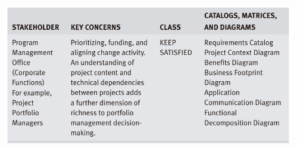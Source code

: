 \documentclass[aspectratio=169, table]{beamer}
\begin{document}
{\begin{frame}
\begin{columns}
\begin{column}{0.5\textwidth}
                \end{column}
                \begin{column}{0.5\textwidth}
                    \begin{center}
                        \includegraphics[width=\textwidth]{../figures/stakeholder_map_2}
                    \end{center}
                \end{column}
            \end{columns}

        \end{frame}
    }
\end{document}
